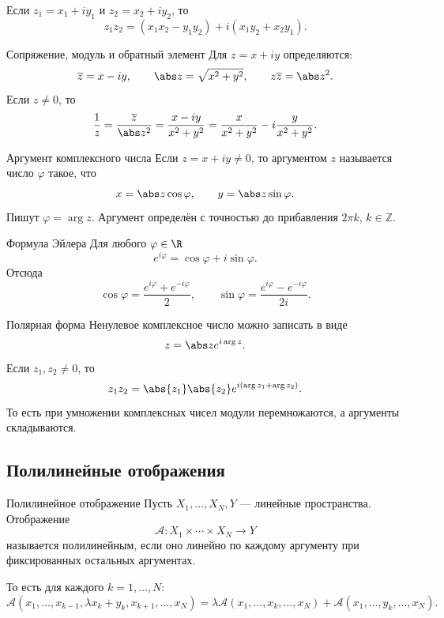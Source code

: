 Если $z_1=x_1+iy_1$ и $z_2=x_2+iy_2$, то
\[
z_1z_2
=
(x_1x_2-y_1y_2)
+
i(x_1y_2+x_2y_1).
\]

\begin{Definition}{Сопряжение, модуль и обратный элемент}{}
	Для $z=x+iy$ определяются:
	\[
	\overline z=x-iy,
	\qquad
	\abs z=\sqrt{x^2+y^2},
	\qquad
	z\overline z=\abs z^2.
	\]
	Если $z\ne0$, то
	\[
	\frac1z
	=
	\frac{\overline z}{\abs z^2}
	=
	\frac{x-iy}{x^2+y^2}
	=
	\frac{x}{x^2+y^2}
	-
	i\frac{y}{x^2+y^2}.
	\]
\end{Definition}

\begin{Definition}{Аргумент комплексного числа}{}
	Если $z=x+iy\ne0$, то аргументом $z$ называется число $\varphi$ такое, что
	\[
	x=\abs z\cos\varphi,
	\qquad
	y=\abs z\sin\varphi.
	\]
	Пишут $\varphi=\arg z$. Аргумент определён с точностью до прибавления $2\pi k$, $k\in\mathbb Z$.
\end{Definition}

\begin{Statement}{Формула Эйлера}{}
	Для любого $\varphi\in\R$
	\[
	e^{i\varphi}=\cos\varphi+i\sin\varphi.
	\]
	Отсюда
	\[
	\cos\varphi=\frac{e^{i\varphi}+e^{-i\varphi}}2,
	\qquad
	\sin\varphi=\frac{e^{i\varphi}-e^{-i\varphi}}{2i}.
	\]
\end{Statement}

\begin{Remark}{Полярная форма}{}
	Ненулевое комплексное число можно записать в виде
	\[
	z=\abs z e^{i\arg z}.
	\]
	Если $z_1,z_2\ne0$, то
	\[
	z_1z_2
	=
	\abs{z_1}\abs{z_2}
	e^{i(\arg z_1+\arg z_2)}.
	\]
	То есть при умножении комплексных чисел модули перемножаются, а аргументы складываются.
\end{Remark}

\subsection{Полилинейные отображения}

\begin{Definition}{Полилинейное отображение}{}
	Пусть $X_1,\ldots,X_N,Y$ --- линейные пространства. Отображение
	\[
	\mathcal A\colon X_1\times\cdots\times X_N\to Y
	\]
	называется полилинейным, если оно линейно по каждому аргументу при фиксированных остальных аргументах.
	
	То есть для каждого $k=1,\ldots,N$:
	\[
	\mathcal A(x_1,\ldots,x_{k-1},\lambda x_k+y_k,x_{k+1},\ldots,x_N)
	=
	\lambda\mathcal A(x_1,\ldots,x_k,\ldots,x_N)
	+
	\mathcal A(x_1,\ldots,y_k,\ldots,x_N).
	\]
\end{Definition}

